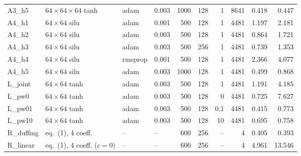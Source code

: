 {\begin{longtable}{@{}l l l l r r r r r r@{}}
A3\_h5 & $64\times64\times64$ tanh & adam & 0.003 & 1000 & 128 & 1 & 8641 & 0.418 & 0.447\\
A4\_h1 & $64\times64$ silu & adam & 0.001 & 500 & 128 & 1 & 4481 & 1.197 & 2.181\\
A4\_h2 & $64\times64$ silu & adam & 0.003 & 500 & 128 & 1 & 4481 & 0.864 & 1.721\\
A4\_h3 & $64\times64$ silu & adam & 0.003 & 500 & 256 & 1 & 4481 & 0.739 & 1.353\\
A4\_h4 & $64\times64$ silu & rmsprop & 0.001 & 500 & 128 & 1 & 4481 & 2.366 & 4.077\\
A4\_h5 & $64\times64$ silu & adam & 0.003 & 1000 & 128 & 1 & 4481 & 0.499 & 0.868\\
L\_joint & $64\times64$ tanh & adam & 0.003 & 500 & 128 & 1 & 4481 & 1.191 & 4.185\\
L\_pw0 & $64\times64$ tanh & adam & 0.003 & 500 & 128 & 0 & 4481 & 0.725 & 7.627\\
L\_pw01 & $64\times64$ tanh & adam & 0.003 & 500 & 128 & 0.1 & 4481 & 0.415 & 0.773\\
L\_pw10 & $64\times64$ tanh & adam & 0.003 & 500 & 128 & 10 & 4481 & 0.695 & 0.758\\
R\_duffing & eq.\ (1), 4 coeff. & -- & -- & 600 & 256 & -- & 4 & 0.405 & 0.393\\
R\_linear & eq.\ (1), 4 coeff. ($c{=}0$) & -- & -- & 600 & 256 & -- & 4 & 4.961 & 13.546\\
\bottomrule
\end{longtable}
}
